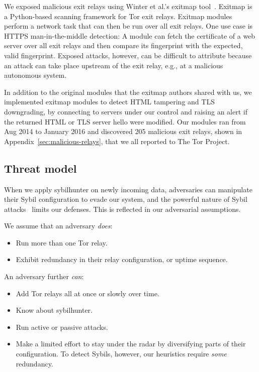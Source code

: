 We exposed malicious exit relays using Winter et al.'s exitmap tool~\cite[\S
3.1]{Winter2014a}.  Exitmap is a Python-based scanning framework for Tor exit
relays.  Exitmap modules perform a network task that can then be run over all
exit relays.  One use case is HTTPS man-in-the-middle detection: A module can
fetch the certificate of a web server over all exit relays and then compare its
fingerprint with the expected, valid fingerprint.  Exposed attacks, however, can
be difficult to attribute because an attack can take place upstream of the exit
relay, e.g., at a malicious autonomous system.

In addition to the original modules that the exitmap authors shared with us, we
implemented exitmap modules to detect HTML tampering and TLS downgrading, by
connecting to servers under our control and raising an alert if the returned
HTML or TLS server hello were modified.  Our modules ran from Aug 2014 to
January 2016 and discovered 205 malicious exit relays, shown in
Appendix~\ref{sec:malicious-relays}, that we all reported to The Tor Project.

\subsection{Threat model}
\label{sec:threat_model}
When we apply sybilhunter on newly incoming data, adversaries can manipulate
their Sybil configuration to evade our system, and the powerful nature of Sybil
attacks~\cite{Douceur2002a} limits our defenses.  This is reflected in our
adversarial assumptions.

We assume that an adversary \emph{does}:
\begin{itemize}
	\item Run more than one Tor relay.

	\item Exhibit redundancy in their relay configuration, or uptime sequence.
\end{itemize}

An adversary further \emph{can}:
\begin{itemize}
	\item Add Tor relays all at once or slowly over time.

	\item Know about sybilhunter.

	\item Run active or passive attacks.

	\item Make a limited effort to stay under the radar by diversifying parts of
		their configuration.  To detect Sybils, however, our heuristics require
		\emph{some} redundancy.
\end{itemize}


